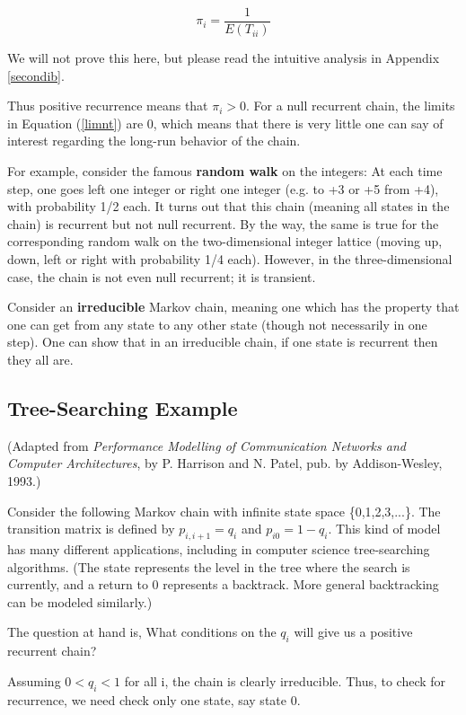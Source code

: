 \documentclass[11pt]{article}
\begin{document}
\begin{equation}
\label{etii}
\pi_{i}=\frac{1}{E(T_{ii})}
\end{equation}

We will not prove this here, but please read the intuitive analysis in
Appendix \ref{secondib}.  

Thus positive recurrence means that $\pi_{i}>0$. For a null
recurrent chain, the limits in Equation (\ref{limnt}) are 0, which means
that there is very little one can say of interest regarding the long-run
behavior of the chain.

For example, consider the famous \textbf{random walk} on the integers:
At each time step, one goes left one integer or right one integer (e.g.
to +3 or +5 from +4), with probability 1/2 each. It turns out that this
chain (meaning all states in the chain) is recurrent but not null
recurrent. By the way, the same is true for the corresponding random
walk on the two-dimensional integer lattice (moving up, down, left or
right with probability 1/4 each). However, in the three-dimensional
case, the chain is not even null recurrent; it is transient.

Consider an \textbf{irreducible} Markov chain, meaning one which has the
property that one can get from any state to any other state (though not
necessarily in one step).  One can show that in an irreducible chain, if
one state is recurrent then they all are.

\subsection{Tree-Searching Example}

(Adapted from {\it Performance Modelling of Communication Networks and
Computer Architectures}, by P. Harrison and N. Patel, pub. by
Addison-Wesley, 1993.)

Consider the following Markov chain with infinite state space
\{0,1,2,3,...\}.  The transition matrix is defined by $p_{i,i+1}=q_{i}$
and $p_{i0}=1-q_{i}$. This kind of model has many different
applications, including in computer science tree-searching algorithms.
(The state represents the level in the tree where the search is
currently, and a return to 0 represents a backtrack. More general
backtracking can be modeled similarly.)

The question at hand is, What conditions on the $q_{i}$ will give us
a positive recurrent chain?

Assuming $0<q_{i}<1$ for all i, the chain is clearly irreducible.
Thus, to check for recurrence, we need check only one state, say state
0.
\end{document}
